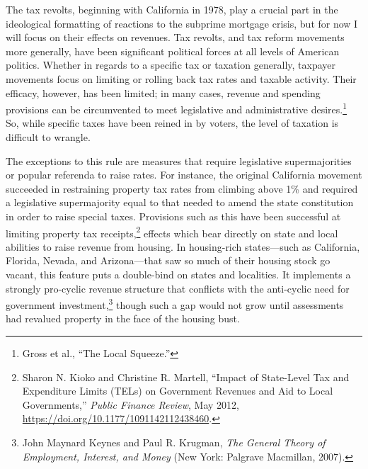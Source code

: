 \documentclass[12pt,oneside]{psthesis}
\begin{document}
The tax revolts, beginning with California in 1978, play a crucial part in the ideological formatting of reactions to the subprime mortgage crisis, but for now I will focus on their effects on revenues.
Tax revolts, and tax reform movements more generally, have been significant political forces at all levels of American politics.
Whether in regards to a specific tax or taxation generally, taxpayer movements focus on limiting or rolling back tax rates and taxable activity.
Their efficacy, however, has been limited; in many cases, revenue and spending provisions can be circumvented to meet legislative and administrative desires.\footnote{Gross et al., ``The Local Squeeze.''}
So, while specific taxes have been reined in by voters, the level of taxation is difficult to wrangle.

The exceptions to this rule are measures that require legislative supermajorities or popular referenda to raise rates.
For instance, the original California movement succeeded in restraining property tax rates from climbing above 1\% and required a legislative supermajority equal to that needed to amend the state constitution in order to raise special taxes.
Provisions such as this have been successful at limiting property tax receipts,\footnote{Sharon N. Kioko and Christine R. Martell, ``Impact of State-Level Tax and Expenditure Limits (TELs) on Government Revenues and Aid to Local Governments,'' \emph{Public Finance Review}, May 2012, \url{https://doi.org/10.1177/1091142112438460}.} effects which bear directly on state and local abilities to raise revenue from housing.
In housing-rich states---such as California, Florida, Nevada, and Arizona---that saw so much of their housing stock go vacant, this feature puts a double-bind on states and localities.
It implements a strongly pro-cyclic revenue structure that conflicts with the anti-cyclic need for government investment,\footnote{John Maynard Keynes and Paul R. Krugman, \emph{The General Theory of Employment, Interest, and Money} (New York: Palgrave Macmillan, 2007).} though such a gap would not grow until assessments had revalued property in the face of the housing bust.
\end{document}
